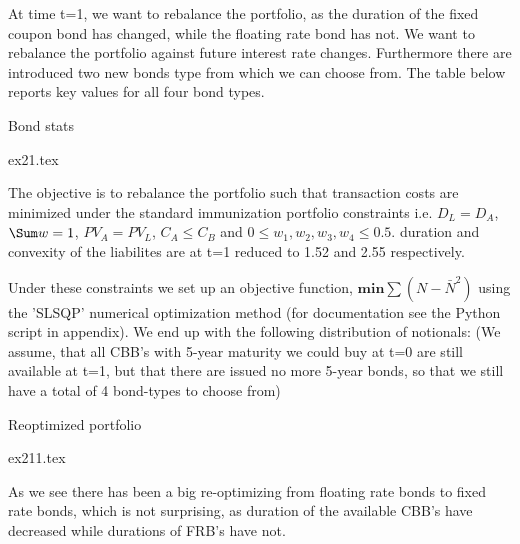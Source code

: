 
At time t=1, we want to rebalance the portfolio, as the duration of the fixed coupon bond has changed, while the floating rate bond has not. We want to rebalance the portfolio against future interest rate changes. Furthermore there are introduced two new bonds type from which we can choose from. The table below reports key values for all four bond types.

\begin{table}[ht]
\centering
\caption{Bond stats}
\label{tab:bond_stats}
{ex21.tex}
\end{table}

The objective is to rebalance the portfolio such that transaction costs are minimized under the standard immunization portfolio constraints i.e. $D_{L}=D_{A}$, $\Sum w = 1$, $PV_{A}=PV_{L}$, $C_{A} \leq C_{B} $ and $ 0 \leq w_1, w_2, w_3, w_4 \leq  0.5$. duration and convexity of the liabilites are at t=1 reduced to 1.52 and 2.55 respectively.

Under these constraints we set up an objective function, $\textbf{min}\sum(N-\bar{N}^2)$ using the 'SLSQP' numerical optimization method (for documentation see the Python script in appendix). We end up with the following distribution of notionals:
(We assume, that all CBB's with 5-year maturity we could buy at t=0 are still available at t=1, but that there are issued no more 5-year bonds, so that we still have a total of 4 bond-types to choose from)

\begin{table}[ht]
\centering
\caption{Reoptimized portfolio}
\label{tab:reopt_port}
{ex211.tex}
\end{table}

As we see there has been a big re-optimizing from floating rate bonds to fixed rate bonds, which is not surprising, as duration of the available CBB's have decreased while durations of FRB's have not.  
